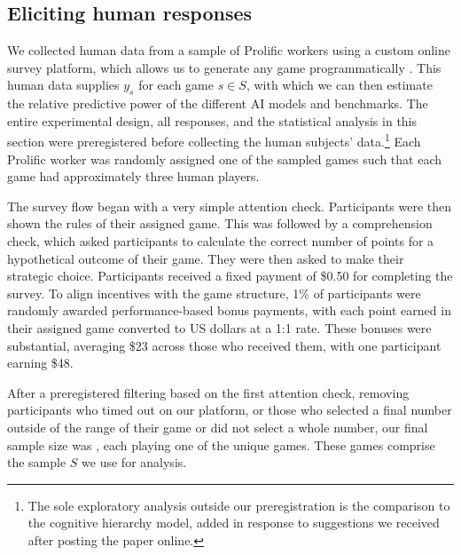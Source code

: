 \subsection{Eliciting human responses}

We collected human data from a sample of \NParticipantS{} Prolific workers using a custom online survey platform, which allows us to generate any game programmatically \citep{Horton2024EDSL}.
This human data supplies $y_{s}$ for each game $s \in S$, with which we can then estimate the relative predictive power of the different AI models and benchmarks.
The entire experimental design, all \aisub{} responses, and the statistical analysis in this section were preregistered before collecting the human subjects' data.\footnote{The sole exploratory analysis outside our preregistration is the comparison to the cognitive hierarchy model, added in response to suggestions we received after posting the paper online.}
Each Prolific worker was randomly assigned one of the \NGamesS{} sampled games such that each game had approximately three human players.

The survey flow began with a very simple attention check.
Participants were then shown the rules of their assigned game.
This was followed by a comprehension check, which asked participants to calculate the correct number of points for a hypothetical outcome of their game.
They were then asked to make their strategic choice.
Participants received a fixed payment of \$0.50 for completing the survey.
To align incentives with the game structure, 1\% of participants were randomly awarded performance-based bonus payments, with each point earned in their assigned game converted to US dollars at a 1:1 rate.
These bonuses were substantial, averaging \$23 across those who received them, with one participant earning \$48.

After a preregistered filtering based on the first attention check, removing participants who timed out on our platform, or those who selected a final number outside of the range of their game or did not select a whole number, our final sample size was \SampleSizeHuman{}, each playing one of the  \SampleSizeGame{} unique games.
These \SampleSizeGame{} games comprise the sample $S$ we use for analysis.
